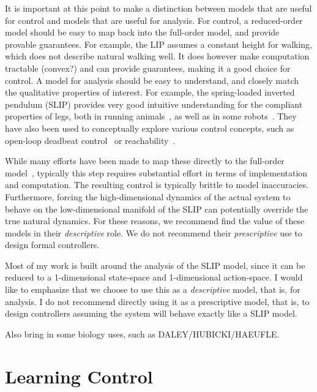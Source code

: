 It is important at this point to make a distinction between models that are useful for control and models that are useful for analysis. For control, a reduced-order model should be easy to map back into the full-order model, and provide provable guarantees. For example, the LIP assumes a constant height for walking, which does not describe natural walking well. It does however make computation tractable (convex?) and can provide guarantees, making it a good choice for control. A model for analysis should be easy to understand, and closely match the qualitative properties of interest. For example, the spring-loaded inverted pendulum (SLIP) provides very good intuitive understanding for the compliant properties of legs, both in running animals~\cite{blickhan1989spring,rummel2008stable,jindrich2002dynamic}, as well as in some robots~\cite{raibert1986legged,altendorfer2004stability}. They have also been used to conceptually explore various control concepts, such as open-loop deadbeat control~\cite{wu20133,palmer2014periodic} or reachability~\cite{piovan2015reachability}. \par
While many efforts have been made to map these directly to the full-order model~\cite{wensing2013high,hutter2010slip,poulakakis2009spring}, typically this step requires substantial effort in terms of implementation and computation. The resulting control is typically brittle to model inaccuracies. Furthermore, forcing the high-dimensional dynamics of the actual system to behave on the low-dimensional manifold of the SLIP can potentially override the true natural dynamics. For these reasons, we recommend find the value of these models in their \emph{descriptive} role. We do not recommend their \emph{prescriptive} use to design formal controllers. \par
Most of my work is built around the analysis of the SLIP model, since it can be reduced to a 1-dimensional state-space and 1-dimensional action-space. I would like to emphasize that we choose to use this as a \emph{descriptive} model, that is, for analysis. I do not recommend directly using it as a prescriptive model, that is, to design controllers assuming the system will behave exactly like a SLIP model. \par

Also bring in some biology uses, such as DALEY/HUBICKI/HAEUFLE.

\section{Learning Control}


